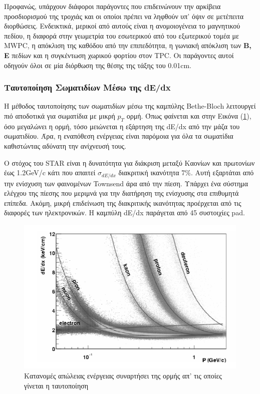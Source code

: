 	Προφανώς, υπάρχουν διάφοροι παράγοντες που επιδεινώνουν την αρκίβεια προσδιορισμού της τροχιάς και οι οποίοι πρέπει να ληφθούν υπ' όψιν σε μετέπειτα διορθώσεις. Ενδεικτικά, μερικοί από αυτούς είναι η ανομοιογένεια το μαγνητικού πεδίου, η διαφορά στην γεωμετρία του εσωτερικού από του εξωτερικού τομέα με MWPC, η απόκλιση της καθόδου από την επιπεδότητα, η γωνιακή απόκλιση των \textbf{B, E} πεδίων και η συγκέντωση χωρικού φορτίου στον TPC. Οι παράγοντες αυτοί οδηγούν όλοι σε μία διόρθωση της θέσης της τάξης του 0.01cm.

\subsubsection{Ταυτοποίηση Σωματιδίων Μέσω της dE/dx}
	
	Η μέθοδος ταυτοποίησης των σωματιδίων μέσω της καμπύλης Bethe-Bloch λειτουργεί πιό αποδοτικά για σωματίδια με μικρή $p_T$ ορμή.  Όπως φαίνεται και στην Εικόνα (\ref{fig3.}), όσο μεγαλώνει η ορμή, τόσο μειώνεται η εξάρτηση της dE/dx από την μάζα του σωματιδίου. Άρα, η εναπόθεση ενέργειας είναι παρόμοια για όλα τα σωματίδια καθιστώντας αδύνατη την ανίχνευσή τους.
	
		Ο στόχος του STAR είναι η δυνατότητα για διάκριση μεταξύ Καονίων και πρωτονίων έως 1.2GeV/c κάτι που απαιτεί $\sigma_{dE/dx}$ διακριτική ικανότητα 7\%. Αυτή εξαρτάται από την ενίσχυση των φαινομένων Townsend άρα από την πίεση. Υπάρχει ένα σύστημα ελέγχου της πίεσης που μεριμνά για την διατήρηση της ενίσχυσης στα επιθυμητά επίπεδα. Ακόμη, μικρή επιδείνωση της διακριτικής ικανότητας προέρχεται από τις διαφορές των ηλεκτρονικών.
		Η καμπύλη dE/dx παράγεται από 45 συστοιχίες pad.
	
\begin{figure}[h!]
	\centering 
	\includegraphics[scale=0.5]{STAR_Detectors/BB_Identification}
	\caption{Κατανομές απώλειας ενέργειας συναρτήσει της ορμής απ' τις οποίες γίνεται η ταυτοποίηση}
	\label{fig3.}
\end{figure}
